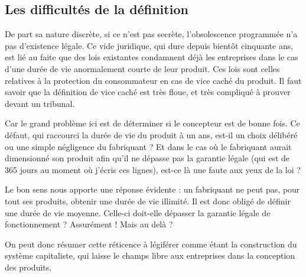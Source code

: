 \subsection{Les difficultés de la définition}

De part sa nature discrète, si ce n'est pas secrète, l'obsolescence programmée n'a pas d'existence légale. Ce vide juridique, qui dure depuis bientôt cinquante ans, est lié au faite que des lois existantes condamnent déjà les entreprises dans le cas d'une durée de vie anormalement courte de leur produit. Ces lois sont celles relatives à la protection du consommateur en cas de vice caché du produit. Il faut savoir que la définition de vice caché est très floue, et très compliqué à prouver devant un tribunal.

Car le grand problème ici est de déterminer si le concepteur est de bonne fois. Ce défaut, qui raccourci la durée de vie du produit à un ans, est-il un choix délibéré ou une simple négligence du fabriquant ? Et dans le cas où le fabriquant aurait dimensionné son produit afin qu'il ne dépasse pas la garantie légale (qui est de 365 jours au moment où j'écris ces lignes), est-ce là une faute aux yeux de la loi ?

Le bon sens nous apporte une réponse évidente : un fabriquant ne peut pas, pour tout ses produits, obtenir une durée de vie illimité. Il est donc obligé de définir une durée de vie moyenne. Celle-ci doit-elle dépasser la garantie légale de fonctionnement ? Assurément ! Mais au delà ?

On peut donc résumer cette réticence à légiférer comme étant la construction du système capitaliste, qui laisse le champs libre aux entreprises dans la conception des produits.
